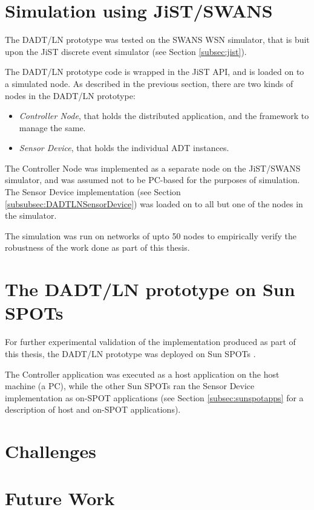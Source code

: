 \section{Simulation using JiST/SWANS}

The DADT/LN prototype was tested on the SWANS WSN simulator, that is buit upon
the JiST discrete event simulator (see Section \ref{subsec:jist}). 

The DADT/LN prototype code is wrapped in the JiST API, and is loaded on to a
simulated node. As described in the previous section, there are two kinds of
nodes in the DADT/LN prototype:

\begin{itemize}
  \item \emph{Controller Node}, that holds the distributed application, and the
  framework to manage the same.
  \item \emph{Sensor Device}, that holds the individual ADT instances. 
\end{itemize}

The Controller Node was implemented as a separate node on the JiST/SWANS
simulator, and was assumed not to be PC-based for the purposes of simulation.
The Sensor Device implementation (see Section
\ref{subsubsec:DADTLNSensorDevice}) was loaded on to all but one of the nodes in
the simulator.

The simulation was run on networks of upto 50 nodes to empirically verify the
robustness of the work done as part of this thesis.

\section{The DADT/LN prototype on Sun SPOTs}

For further experimental validation of the implementation produced as part of 
this thesis,
the DADT/LN prototype was deployed on Sun SPOTs \cite{simon_squawk:2006}. 

The
Controller application was executed as a host application on the host machine (a
PC), while the other Sun SPOTs ran the Sensor Device implementation as on-SPOT
applications (see Section \ref{subsec:sunspotapps} for a description of host and on-SPOT
applications).

\section{Challenges}


\section{Future Work}

